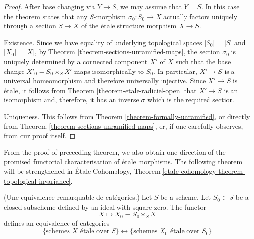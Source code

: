 \begin{proof}
After base changing via $Y \to S$, we may assume that $Y = S$.
In this case the theorem states that any $S$-morphism $\sigma_0 : S_0 \to X$
actually factors uniquely through a section $S \to X$ of the
\'etale structure morphism $X \to S$.

\medskip\noindent
Existence. Since we have equality of underlying topological spaces
$|S_0| = |S|$ and $|X_0| = |X|$,
by Theorem \ref{theorem-sections-unramified-maps},
the section $\sigma_0$ is uniquely determined by a connected component
$X'$ of $X$ such that the base change
$X'_0 = S_0 \times_S X'$ maps isomorphically to $S_0$.
In particular, $X' \to S$ is a universal homeomorphism
and therefore universally injective. Since $X' \to S$ is \'etale, it
follows from Theorem \ref{theorem-etale-radiciel-open}
that $X' \to S$ is an isomorphism and, therefore, it has
an inverse $\sigma$ which is the required section.

\medskip\noindent
Uniqueness. This follows from Theorem
\ref{theorem-formally-unramified}, or directly from Theorem
\ref{theorem-sections-unramified-maps}, or, if one carefully observes,
from our proof itself.
\end{proof}

\noindent
From the proof of preceeding theorem, we also obtain one direction of the
promised functorial characterisation of \'etale morphisms. The following
theorem will be strengthened in
\'Etale Cohomology,
Theorem \ref{etale-cohomology-theorem-topological-invariance}.

\begin{theorem}
\label{theorem-remarkable-equivalence}
(Une equivalence remarquable de cat\'egories.)
Let $S$ be a scheme.
Let $S_0 \subset S$ be a closed subscheme defined by an ideal
with square zero.
The functor
$$
X \longmapsto X_0 = S_0 \times_S X
$$
defines an equivalence of categories
$$
\{
\text{schemes }X\text{ \'etale over }S
\}
\leftrightarrow
\{
\text{schemes }X_0\text{ \'etale over }S_0
\}
$$
\end{theorem}


